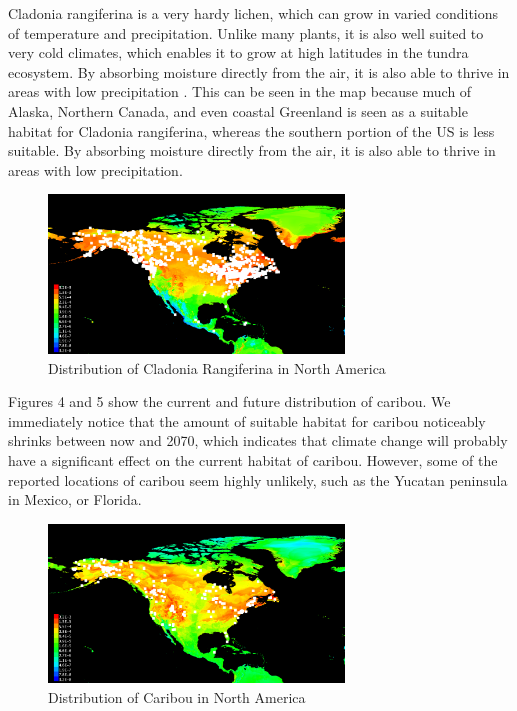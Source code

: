 \documentclass[twoside]{article}
\begin{document}
\indent Cladonia rangiferina is a very hardy lichen, which can grow in varied conditions
of temperature and precipitation. Unlike many plants, it is also well suited
to very cold climates, which enables it to grow at high latitudes in the
tundra ecosystem. By absorbing moisture directly from the air, it is also able
to thrive in areas with low precipitation \cite{usfs}. This can be
seen in the map because much of Alaska, Northern Canada, and even coastal
Greenland is seen as a suitable habitat for Cladonia rangiferina, whereas
the southern portion of the US is less suitable. By absorbing moisture
directly from the air, it is also able to thrive in areas with low
precipitation. \cite{usfs} \\

\begin{figure}[!ht]
\centering
\includegraphics[width=0.7\textwidth]{NCladoniaFuture}
\caption{Distribution of Cladonia Rangiferina in North America}
\end{figure}

\indent Figures 4 and 5 show the current and future distribution of caribou. We
immediately notice that the amount of suitable habitat for caribou noticeably
shrinks between now and 2070, which indicates that climate change will probably
have a significant effect on the current habitat of caribou. However, some of
the reported locations of caribou seem highly unlikely, such as the Yucatan
peninsula in Mexico, or Florida.

\begin{figure}[!ht]
\centering
\includegraphics[width=0.7\textwidth]{NCaribouPresent}
\caption{Distribution of Caribou in North America}
\end{figure}
\end{document}
